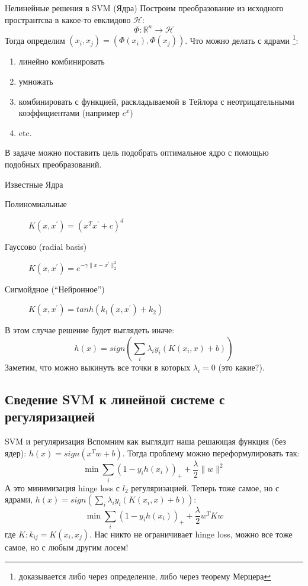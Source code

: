\documentclass[14pt, fleqn, xcolor={dvipsnames, table}]{beamer}
\begin{document}
\begin{frame}{Нелинейные решения в SVM (Ядра)}
\small
Построим преобразование из исходного пространтсва в какое-то евклидово $\mathcal{H}$:
$$
\Phi: \mathbb{R}^n \to \mathcal{H}
$$
Тогда определим $(x_i, x_j) = (\Phi(x_i), \Phi(x_j))$. Что можно делать с ядрами \footnote{доказывается либо через определение, либо через теорему Мерцера}:
\begin{enumerate}
\footnotesize
  \item линейно комбинировать
  \item умножать
  \item комбинировать с функцией, раскладываемой в Тейлора с неотрицательными коэффициентами (например $e^x$)
  \item etc.
\end{enumerate}
В задаче можно поставить цель подобрать оптимальное ядро с помощью подобных преобразований.
\end{frame}

\begin{frame}{Известные Ядра}
\small
\begin{description}
  \item[Полиномиальные] $K(x,x^{'}) = (x^Tx^{'} + c)^d$ 
  \item[Гауссово (radial basis)] $K(x,x^{'}) = e^{-\gamma \|x - x^{'}\|_2^2}$ 
  \item[Сигмойдное (``Нейронное'')] $K(x,x^{'}) = tanh(k_1 (x,x^{'}) + k_2)$ 
\end{description}
В этом случае решение будет выглядеть иначе:
$$
h(x) = sign \left(\sum_i \lambda_i y_i (K(x_i, x) + b)\right)
$$
Заметим, что можно выкинуть все точки в которых $\lambda_i = 0$ (это какие?).
\end{frame}

\subsection{Сведение SVM к линейной системе с регуляризацией} %

\begin{frame}{SVM и регуляризация}
\small
Вспомним как выглядит наша решающая функция (без ядер): $h(x) = sign(x^T w + b)$. Тогда проблему можно переформулировать так:
$$
\min \sum_i (1 - y_i h(x_i))_+ + \frac{\lambda}{2} \|w\|^2
$$
А это минимизация hinge loss с $l_2$ регуляризацией. Теперь тоже самое, но с ядрами, $h(x) = sign \left(\sum_i \lambda_i y_i (K(x_i, x) + b)\right)$:
$$
\min \sum_i (1 - y_i h(x_i))_+ + \frac{\lambda}{2} w^T K w
$$
где $K : k_{ij} = K(x_i, x_j)$. Нас никто не ограничивает hinge loss, можно все тоже самое, но с любым другим лосем!
\end{frame}
\end{document}
